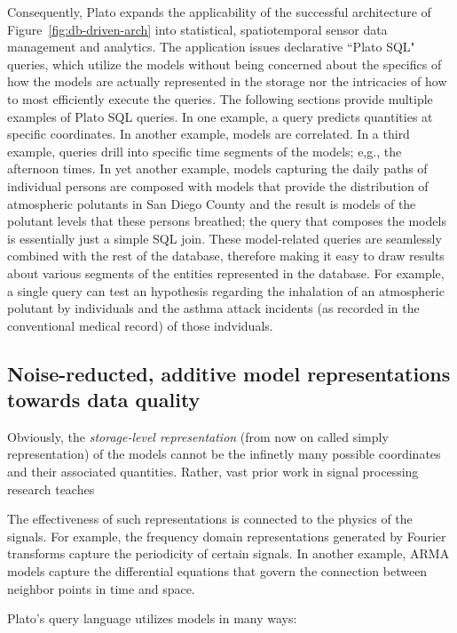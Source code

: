Consequently, Plato expands the applicability of the successful architecture of Figure~\ref{fig:db-driven-arch} into statistical, spatiotemporal sensor data management and analytics. The application issues declarative ``Plato SQL" queries, which utilize the models without being concerned about the specifics of how the models are actually represented in the storage nor the intricacies of how to most efficiently execute the queries. The following sections provide multiple examples of Plato SQL queries. In one example, a query predicts quantities at specific coordinates. In another example, models are correlated. In a third example, queries drill into specific time segments of the models; e,g., the afternoon times. In yet another example, models capturing the daily paths of individual persons are composed with models that provide the distribution of atmospheric polutants in San Diego County and the result is models of the polutant levels that these persons breathed; the query that composes the models is essentially just a simple SQL join. These model-related queries are seamlessly combined with the rest of the database, therefore making it easy to draw results about various segments of the entities represented in the database. For example, a single query can test an hypothesis regarding the inhalation of an atmospheric polutant by individuals and the asthma attack incidents (as recorded in the conventional medical record) of those indviduals.


\subsection{Noise-reducted, additive model representations towards data quality}
Obviously, the {\em storage-level representation} (from now on called simply representation) of the models cannot be the infinetly many possible coordinates and their associated quantities. Rather, vast prior work in signal processing research teaches 

The effectiveness of such representations is connected to the physics of the signals. For example, the frequency domain representations generated by Fourier transforms capture the periodicity of certain signals. In another example, ARMA models capture the differential equations that govern the connection between neighbor points in time and space.

Plato's query language utilizes models in many ways: 


